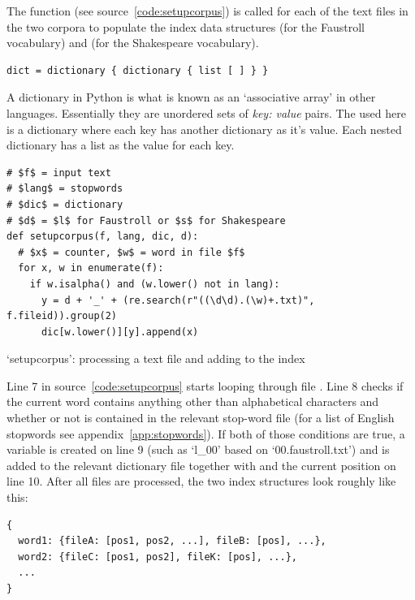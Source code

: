 The  function (see source~\ref{code:setupcorpus}) is called for each of the text files in the two corpora to populate the index data structures  (for the Faustroll vocabulary) and  (for the Shakespeare vocabulary).

\begin{verbatim}
dict = dictionary { dictionary { list [ ] } }
\end{verbatim}

A dictionary in Python is what is known as an `associative array' in other languages. Essentially they are unordered sets of \emph{key: value} pairs. The  used here is a dictionary where each key has another dictionary as it's value. Each nested dictionary has a list as the value for each key.

\begin{listing}[!htbp] %
  \begin{verbatim}
# $f$ = input text
# $lang$ = stopwords
# $dic$ = dictionary
# $d$ = $l$ for Faustroll or $s$ for Shakespeare
def setupcorpus(f, lang, dic, d):
  # $x$ = counter, $w$ = word in file $f$
  for x, w in enumerate(f):
    if w.isalpha() and (w.lower() not in lang):
      y = d + '_' + (re.search(r"((\d\d).(\w)+.txt)", f.fileid)).group(2)
      dic[w.lower()][y].append(x)
  \end{verbatim}
\caption[`setupcorpus' function]{`setupcorpus': processing a text file and adding to the index}
\label{code:setupcorpus}
\end{listing}

Line 7 in source~\ref{code:setupcorpus} starts looping through file . Line 8 checks if the current word  contains anything other than alphabetical characters and whether or not  is contained in the relevant stop-word file  (for a list of English stopwords see appendix~\ref{app:stopwords}). If both of those conditions are true, a variable  is created on line \num{9} (such as `l\_00' based on `00.faustroll.txt') and  is added to the relevant dictionary file  together with  and the current position  on line 10. After all files are processed, the two index structures look roughly like this:

\begin{verbatim}
{
  word1: {fileA: [pos1, pos2, ...], fileB: [pos], ...},
  word2: {fileC: [pos1, pos2], fileK: [pos], ...},
  ...
}
\end{verbatim}

